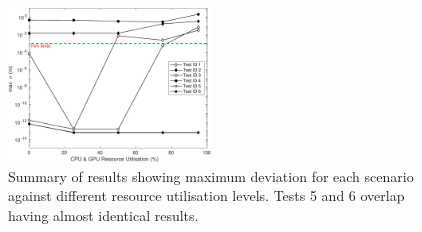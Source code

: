 \documentclass[letterpaper, 10 pt, journal, twoside]{IEEEtran}
\begin{document}
\begin{figure}[!t]
    \centering
    \includegraphics[width=0.48\textwidth]{Other/Figures/ExperimentsStressSummaryV2.pdf}
    \caption{Summary of results showing maximum deviation for each scenario against different resource utilisation levels. Tests 5 and 6 overlap having almost identical results.}
    \label{ExperimentsStressSummary}
\end{figure}





\end{document}
